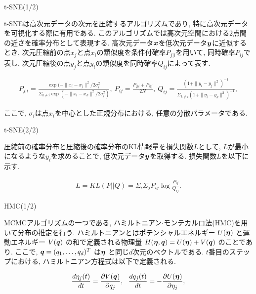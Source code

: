 \documentclass[dvipdfmx]{beamer} %
\newcommand{\bm}[1]{\mbox{\boldmath $#1$}}
\begin{document}
\begin{frame}{t-SNE(1/2)}

t-SNEは高次元データの次元を圧縮するアルゴリズムであり, 特に高次元データを可視化する際に有用である. このアルゴリズムでは高次元空間における$2$点間の近さを確率分布として表現する. 高次元データ$\bm x$を低次元データ$\bm y$に近似するとき, 次元圧縮前の点$x_j$と点$x_i$の類似度を条件付確率$P_{j|i}$を用いて, 同時確率$P_{ij}$で表し, 次元圧縮後の点$y_j$と点$y_i$の類似度を同時確率$Q_{ij}$によって表す.

\footnotesize
\begin{eqnarray*}
\label{tsne1}
P_{j|i} = \frac{\exp(-\|x_i - x_j\|^2 / 2\sigma_i^2}{\Sigma_{k \neq i}\exp(-\|x_i - x_k\|^2/ 2\sigma_i^2)},\ 
P_{ij} = \frac{P_{j|i} + P_{i|j}}{2N},\ 
Q_{ij} = \frac{(1 + \|y_i - y_j\|^2)^{-1}}{\Sigma_{k \neq i}(1 + \|y_i - y_k\|^2)^{-1}},
\end{eqnarray*}
\normalsize

\noindent
ここで, $\sigma_i$は点$x_i$を中心とした正規分布における, 任意の分散パラメータである.
\end{frame}

\begin{frame}{t-SNE(2/2)}

圧縮前の確率分布と圧縮後の確率分布のKL情報量を損失関数$L$として, $L$が最小になるような$y_i$を求めることで, 低次元データ$\bm y$を取得する. 損失関数$L$を以下に示す.

\begin{eqnarray*}
\label{tsne3}
L = KL(P || Q) = \Sigma_i \Sigma_j P_{ij} \log \frac{P_{ij}}{Q_{ij}}.
\end{eqnarray*}
\end{frame}

\begin{frame}{HMC(1/2)}

MCMCアルゴリズムの一つである, ハミルトニアン$\cdot$モンテカルロ法(HMC)を用いて分布の推定を行う. ハミルトニアンとはポテンシャルエネルギー $U(\bm \eta)$ と運動エネルギー $V(\bm q)$ の和で定義される物理量 $H(\bm \eta, \bm q) = U(\bm \eta) + V(\bm q)$ のことであり. ここで, $\bm q = (q_1, \dots, q_d)^T$ は$\bm \eta$ と同じ$d$次元のベクトルである. $t$番目のステップにおける, ハミルトニアン方程式は以下で定義される. 

\begin{eqnarray*}
\label{HMC}
\frac{d \eta_j(t)}{dt} = \frac{\partial V(\bm q)}{\partial q_j},\ \ \frac{d q_j(t)}{dt} = - \frac{\partial U(\bm \eta)}{\partial \eta_j},
\end{eqnarray*}
\end{frame}
\end{document}
